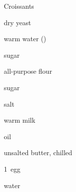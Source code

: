 \begin{recipe}{Croissants\UNTESTED}{}{}

\begin{ingredients}
\item \tp{1\quarter} dry yeast
\item {} warm water ()
\item {} sugar
\item \C{1\threequarter} all-purpose flour
\item {} sugar
\item \tp{1\half} salt
\item \C{\twothird} warm milk
\item {} oil
\item \C{\twothird} unsalted butter, chilled
\item 1~egg
\item {} water
\end{ingredients}


\end{recipe}

